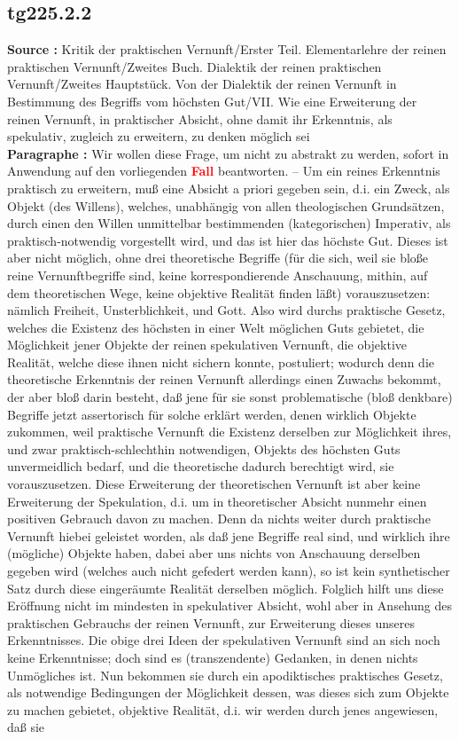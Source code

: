 \documentclass[a4paper,12pt,twoside]{book}
\newcommand{\match}[1]{\textcolor{red}{\textbf{#1}}}
\begin{document}
	\subsection*{tg225.2.2} 
	\textbf{Source : }Kritik der praktischen Vernunft/Erster Teil. Elementarlehre der reinen praktischen Vernunft/Zweites Buch. Dialektik der reinen praktischen Vernunft/Zweites Hauptstück. Von der Dialektik der reinen Vernunft in Bestimmung des Begriffs vom höchsten Gut/VII. Wie eine Erweiterung der reinen Vernunft, in praktischer Absicht, ohne damit ihr Erkenntnis, als spekulativ, zugleich zu erweitern, zu denken möglich sei\\  
	
	\noindent\textbf{Paragraphe : }Wir wollen diese Frage, um nicht zu abstrakt zu werden, sofort in Anwendung auf den vorliegenden \match{Fall} beantworten. – Um ein reines Erkenntnis praktisch zu erweitern, muß eine Absicht a priori gegeben sein, d.i. ein Zweck, als Objekt (des Willens), welches, unabhängig von allen theologischen Grundsätzen, durch einen den Willen unmittelbar bestimmenden (kategorischen) Imperativ, als praktisch-notwendig vorgestellt wird, und das ist hier das höchste Gut. Dieses ist aber nicht möglich, ohne drei theoretische Begriffe (für die sich, weil sie bloße reine Vernunftbegriffe sind, keine korrespondierende Anschauung, mithin, auf dem theoretischen Wege, keine objektive Realität finden läßt) vorauszusetzen: nämlich Freiheit, Unsterblichkeit, und Gott. Also wird durchs praktische Gesetz, welches die Existenz des höchsten in einer Welt möglichen Guts gebietet,  die Möglichkeit jener Objekte der reinen spekulativen Vernunft, die objektive Realität, welche diese ihnen nicht sichern konnte, postuliert; wodurch denn die theoretische Erkenntnis der reinen Vernunft allerdings einen Zuwachs bekommt, der aber bloß darin besteht, daß jene für sie sonst problematische (bloß denkbare) Begriffe jetzt assertorisch für solche erklärt werden, denen wirklich Objekte zukommen, weil praktische Vernunft die Existenz derselben zur Möglichkeit ihres, und zwar praktisch-schlechthin notwendigen, Objekts des höchsten Guts unvermeidlich bedarf, und die theoretische dadurch berechtigt wird, sie vorauszusetzen. Diese Erweiterung der theoretischen Vernunft ist aber keine Erweiterung der Spekulation, d.i. um in theoretischer Absicht nunmehr einen positiven Gebrauch davon zu machen. Denn da nichts weiter durch praktische Vernunft hiebei geleistet worden, als daß jene Begriffe real sind, und wirklich ihre (mögliche) Objekte haben, dabei aber uns nichts von Anschauung derselben gegeben wird (welches auch nicht gefedert werden kann), so ist kein synthetischer Satz durch diese eingeräumte Realität derselben möglich. Folglich hilft uns diese Eröffnung nicht im mindesten in spekulativer Absicht, wohl aber in Ansehung des praktischen Gebrauchs der reinen Vernunft, zur Erweiterung dieses unseres Erkenntnisses. Die obige drei Ideen der spekulativen Vernunft sind an sich noch keine Erkenntnisse; doch sind es (transzendente) Gedanken, in denen nichts Unmögliches ist. Nun bekommen sie durch ein apodiktisches praktisches Gesetz, als notwendige Bedingungen der Möglichkeit dessen, was dieses sich zum Objekte zu machen gebietet, objektive Realität, d.i. wir werden durch jenes angewiesen, daß sie 
\end{document}
